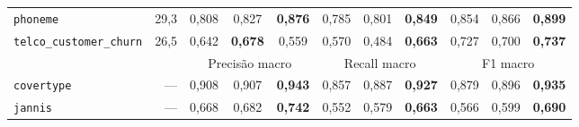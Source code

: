 \begin{table}[htbp]
\begin{tabular}{lr ccc ccc ccc}
\texttt{phoneme} & 29{,}3 & 0{,}808 & 0{,}827 & \textbf{0{,}876} & 0{,}785 & 0{,}801 & \textbf{0{,}849} & 0{,}854 & 0{,}866 & \textbf{0{,}899} \\
\texttt{telco\_\allowbreak customer\_\allowbreak churn} & 26{,}5 & 0{,}642 & \textbf{0{,}678} & 0{,}559 & 0{,}570 & 0{,}484 & \textbf{0{,}663} & 0{,}727 & 0{,}700 & \textbf{0{,}737} \\
\midrule
 & & \multicolumn{3}{c}{Precisão macro} & \multicolumn{3}{c}{Recall macro} & \multicolumn{3}{c}{F1 macro} \\
\cmidrule(lr){3-5}\cmidrule(lr){6-8}\cmidrule(lr){9-11}
\texttt{covertype} & --- & 0{,}908 & 0{,}907 & \textbf{0{,}943} & 0{,}857 & 0{,}887 & \textbf{0{,}927} & 0{,}879 & 0{,}896 & \textbf{0{,}935} \\
\texttt{jannis} & --- & 0{,}668 & 0{,}682 & \textbf{0{,}742} & 0{,}552 & 0{,}579 & \textbf{0{,}663} & 0{,}566 & 0{,}599 & \textbf{0{,}690} \\
\bottomrule
\end{tabular}
\end{table}
